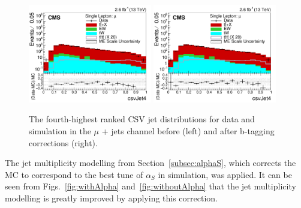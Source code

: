 \begin{figure}[ht!]
    \includegraphics[width=0.48\textwidth]{images/Run2/csvJet4_StackLogY_noSF.pdf}
    \includegraphics[width=0.48\textwidth]{images/Run2/csvJet4_StackLogY.pdf}
    \caption{ The fourth-highest ranked CSV jet distributions for data and simulation in the $\mu$ + jets channel before (left) and after b-tagging corrections (right).}
    \label{fig:csvJet4SF}
\end{figure}
 

The jet multiplicity modelling from Section~\ref{subsec:alphaS}, which corrects the MC to correspond to the best tune of $\alpha_S$ in simulation, was applied. It can be seen from Figs.~\ref{fig:withAlpha} and~\ref{fig:withoutAlpha} that the jet multiplicity modelling is greatly improved by applying this correction.

